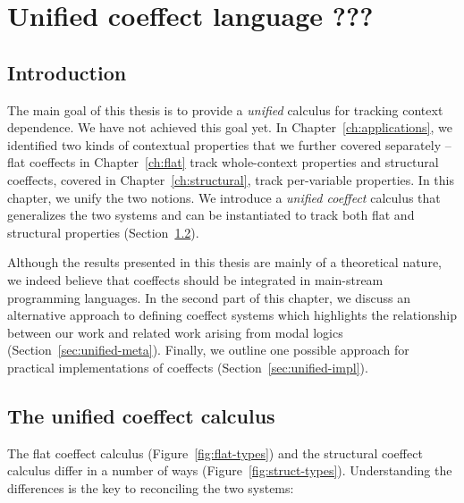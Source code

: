 
\chapter{Unified coeffect language ???} 
\label{ch:unified} 


\section{Introduction}

The main goal of this thesis is to provide a \emph{unified} calculus for tracking context 
dependence. We have not achieved this goal yet. In Chapter~\ref{ch:applications}, we identified 
two kinds of contextual properties that we further covered separately -- flat coeffects in 
Chapter~\ref{ch:flat} track whole-context properties and structural coeffects, covered in 
Chapter~\ref{ch:structural}, track per-variable properties. In this chapter, we unify
the two notions. We introduce a \emph{unified coeffect} calculus that generalizes the two systems
and can be instantiated to track both flat and structural properties (Section~\ref{sec:unified-unified}). 

Although the results presented in this thesis are mainly of a theoretical nature, we indeed 
believe that coeffects should be integrated in main-stream programming languages. In the second
part of this chapter, we discuss an alternative approach to defining coeffect 
systems which highlights the relationship between our work and related work arising from modal logics 
(Section~\ref{sec:unified-meta}). Finally, we outline one possible approach for practical
implementations of coeffects (Section~\ref{sec:unified-impl}).


\section{The unified coeffect calculus}
\label{sec:unified-unified}

The flat coeffect calculus (Figure~\ref{fig:flat-types}) and the structural coeffect calculus 
differ in a number of ways (Figure~\ref{fig:struct-types}). Understanding the differences is the 
key to reconciling the two systems:

